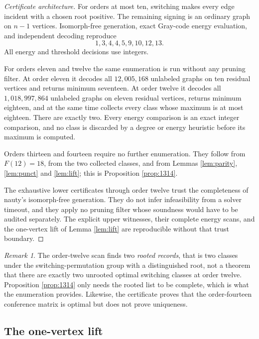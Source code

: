 \documentclass[11pt]{article}
\theoremstyle{remark}
\newtheorem{remark}[theorem]{Remark}
\begin{document}
\begin{proof}[Certificate architecture]
For orders at most ten, switching makes every edge incident with a chosen
root positive.  The remaining signing is an ordinary graph on $n-1$
vertices.  Isomorph-free generation, exact Gray-code energy evaluation, and
independent decoding reproduce
\[
 1,3,4,4,5,9,10,12,13.
\]
All energy and threshold decisions use integers.

For orders eleven and twelve the same enumeration is run without any pruning
filter.  At order eleven it decodes all $12{,}005{,}168$ unlabeled graphs on
ten residual vertices and returns minimum seventeen.  At order twelve it
decodes all $1{,}018{,}997{,}864$ unlabeled graphs on eleven residual
vertices, returns minimum eighteen, and at the same time collects every class
whose maximum is at most eighteen.  There are exactly two.  Every energy
comparison is an exact integer comparison, and no class is discarded by a
degree or energy heuristic before its maximum is computed.

Orders thirteen and fourteen require no further enumeration.  They follow from
$F(12)=18$, from the two collected classes, and from
Lemmas \ref{lem:parity}, \ref{lem:punct} and \ref{lem:lift}; this is
Proposition \ref{prop:1314}.

The exhaustive lower certificates through order twelve trust the completeness
of nauty's isomorph-free generation.  They do not infer infeasibility from a
solver timeout, and they apply no pruning filter whose soundness would have to
be audited separately.  The explicit upper witnesses, their complete energy
scans, and the one-vertex lift of Lemma \ref{lem:lift} are reproducible
without that trust boundary.
\end{proof}

\begin{remark}
The order-twelve scan finds two \emph{rooted records}, that is two classes
under the switching-permutation group with a distinguished root, not a theorem
that there are exactly two unrooted optimal switching classes at order twelve.
Proposition \ref{prop:1314} only needs the rooted list to be complete, which
is what the enumeration provides.  Likewise, the certificate proves that the
order-fourteen conference matrix is optimal but does not prove uniqueness.
\end{remark}

\subsection{The one-vertex lift}
\end{document}
